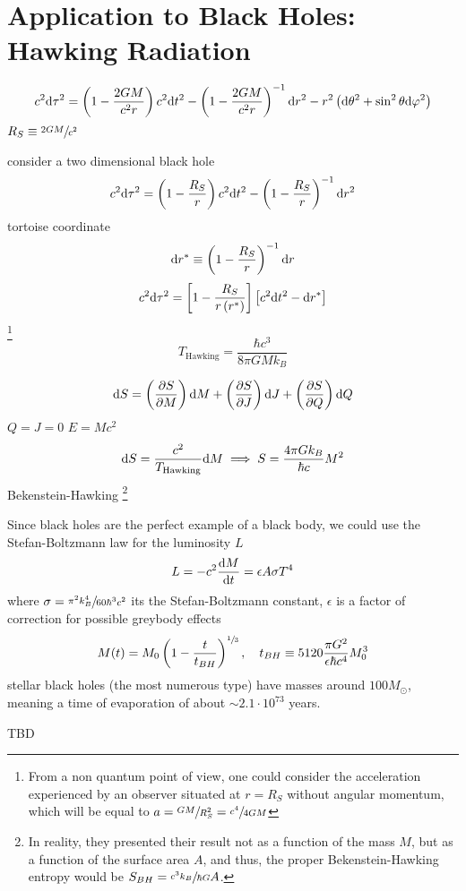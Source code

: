 \section{Application to Black Holes: Hawking Radiation}
\begin{equation}
	c^2\text{d}\tau^2=\left(1-\frac{2GM}{c^2r}\right)c^2\text{d} t^2-\left(1-\frac{2GM}{c^2r}\right)^{-1}\text{d} r^2-r^2\left(\text{d}\theta^2+\sin^2\theta\text{d}\varphi^2\right)
\end{equation}
$R_S\equiv\sfrac{2GM}{c^2}$

consider a two dimensional black hole
\begin{equation}
	c^2\text{d}\tau^2=\left(1-\frac{R_S}{r}\right)c^2\text{d} t^2-\left(1-\frac{R_S}{r}\right)^{-1}\text{d} r^2
\end{equation}
tortoise coordinate
\begin{equation}
	\text{d} r^*\equiv \left(1-\frac{R_S}{r}\right)^{-1}\text{d} r
\end{equation}
\begin{equation}
	c^2\text{d}\tau^2=\left[1-\frac{R_S}{r\left(r^*\right)}\right]\left[c^2\text{d} t^2-\text{d} r^*\right]
\end{equation}
\footnote{From a non quantum point of view, one could consider the acceleration experienced by an observer situated at $r=R_S$ without angular momentum, which will be equal to $a=\sfrac{GM}{R_S^2}=\sfrac{c^4}{4GM}$}
\begin{equation}
	T_{\text{Hawking}}=\frac{\hbar c^3}{8\pi GMk_B}
\end{equation}

\begin{equation}
	\text{d} S=\left(\frac{\partial S}{\partial M}\right)\text{d} M+\left(\frac{\partial S}{\partial J}\right)\text{d} J+\left(\frac{\partial S}{\partial Q}\right)\text{d} Q
\end{equation}
$Q=J=0$ $E=Mc^2$
\begin{equation}
	\text{d} S=\frac{c^2}{T_{\text{Hawking}}}\text{d} M\implies S=\frac{4\pi Gk_B}{\hbar c}M^2
\end{equation}
Bekenstein-Hawking \footnote{In reality, they presented their result not as a function of the mass $M$, but as a function of the surface area $A$, and thus, the proper Bekenstein-Hawking entropy would be $S_{BH}=\sfrac{c^3k_B}{\hbar G}A$.}

Since black holes are the perfect example of a black body, we could use the Stefan-Boltzmann law for the luminosity $L$
\begin{equation}
	L=-c^2\frac{\text{d} M}{\text{d} t}=\epsilon A \sigma T^4
\end{equation}
where $\sigma=\sfrac{\pi^2 k_B^4}{60\hbar^3c^2}$ its the Stefan-Boltzmann constant, $\epsilon$ is a factor of correction for possible greybody effects
\begin{equation}
	M(t)=M_0\left(1-\frac{t}{t_{BH}}\right)^{\sfrac{1}{3}},\quad t_{BH}\equiv 5120\frac{\pi G^2}{\epsilon\hbar c^4}M_0^3
\end{equation}
stellar black holes (the most numerous type) have masses around $100M_\odot$, meaning a time of evaporation of about $\sim 2.1\cdot10^{73}$ years.

TBD
